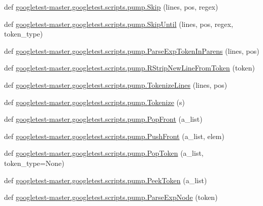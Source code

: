 \begin{DoxyCompactItemize}
\item 
def \mbox{\hyperlink{namespacegoogletest-master_1_1googletest_1_1scripts_1_1pump_abce210f0a086e71814024fc85998d37a}{googletest-\/master.\+googletest.\+scripts.\+pump.\+Skip}} (lines, pos, regex)
\item 
def \mbox{\hyperlink{namespacegoogletest-master_1_1googletest_1_1scripts_1_1pump_a64e3cd351d9386eec385aa0d6fad39e6}{googletest-\/master.\+googletest.\+scripts.\+pump.\+Skip\+Until}} (lines, pos, regex, token\+\_\+type)
\item 
def \mbox{\hyperlink{namespacegoogletest-master_1_1googletest_1_1scripts_1_1pump_a537d516093b78508be7e497a030bdb44}{googletest-\/master.\+googletest.\+scripts.\+pump.\+Parse\+Exp\+Token\+In\+Parens}} (lines, pos)
\item 
def \mbox{\hyperlink{namespacegoogletest-master_1_1googletest_1_1scripts_1_1pump_ac003d26c66373025f3fed310d3767ee6}{googletest-\/master.\+googletest.\+scripts.\+pump.\+R\+Strip\+New\+Line\+From\+Token}} (token)
\item 
def \mbox{\hyperlink{namespacegoogletest-master_1_1googletest_1_1scripts_1_1pump_a9d87707ea33dd6bcac434ed52e778132}{googletest-\/master.\+googletest.\+scripts.\+pump.\+Tokenize\+Lines}} (lines, pos)
\item 
def \mbox{\hyperlink{namespacegoogletest-master_1_1googletest_1_1scripts_1_1pump_a52092664233b262eb52dc977f503b5a3}{googletest-\/master.\+googletest.\+scripts.\+pump.\+Tokenize}} (s)
\item 
def \mbox{\hyperlink{namespacegoogletest-master_1_1googletest_1_1scripts_1_1pump_aca307ef2f4b7155e2ec3cefd5db02c3e}{googletest-\/master.\+googletest.\+scripts.\+pump.\+Pop\+Front}} (a\+\_\+list)
\item 
def \mbox{\hyperlink{namespacegoogletest-master_1_1googletest_1_1scripts_1_1pump_ad0fa92f5983273a40cb8ef73991b4c06}{googletest-\/master.\+googletest.\+scripts.\+pump.\+Push\+Front}} (a\+\_\+list, elem)
\item 
def \mbox{\hyperlink{namespacegoogletest-master_1_1googletest_1_1scripts_1_1pump_a3f8ca4527c0cff5b2bf305cfd1331647}{googletest-\/master.\+googletest.\+scripts.\+pump.\+Pop\+Token}} (a\+\_\+list, token\+\_\+type=None)
\item 
def \mbox{\hyperlink{namespacegoogletest-master_1_1googletest_1_1scripts_1_1pump_ac6aa88b7d980ef8263dd22b2e318c795}{googletest-\/master.\+googletest.\+scripts.\+pump.\+Peek\+Token}} (a\+\_\+list)
\item 
def \mbox{\hyperlink{namespacegoogletest-master_1_1googletest_1_1scripts_1_1pump_ab5a71a1e660fe55efe0d398d1aef0b43}{googletest-\/master.\+googletest.\+scripts.\+pump.\+Parse\+Exp\+Node}} (token)

\end{DoxyCompactItemize}
